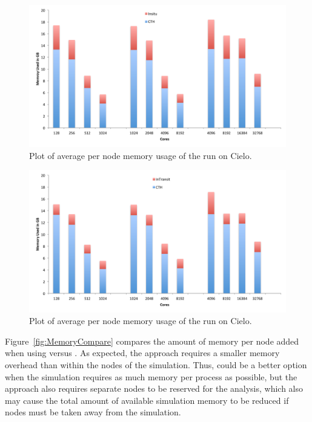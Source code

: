 \begin{figure}[htb]
  \centering
  \includegraphics[width=\linewidth]{figures/MemoryUsageInSituPerNode}
  \caption{Plot of average per node memory usage of the \insitu run on Cielo.}
  \label{fig:MemoryInSituPerNode}
\end{figure}

\begin{figure}[htb]
  \centering
  \includegraphics[width=\linewidth]{figures/MemoryUsageInTransitPerNode}
  \caption{Plot of average per node memory usage of the \intransit run on Cielo.}
  \label{fig:MemoryInTransitPerNode}
\end{figure}

Figure~\ref{fig:MemoryCompare} compares the amount of memory per node added
when using \insitu versus \intransit.  As expected, the \intransit approach
requires a smaller memory overhead than \insitu within the nodes of the
simulation.  Thus, \intransit could be a better option when the simulation
requires as much memory per process as possible, but the \intransit
approach also requires separate nodes to be reserved for the analysis,
which also may cause the total amount of available simulation memory to be
reduced if nodes must be taken away from the simulation.

